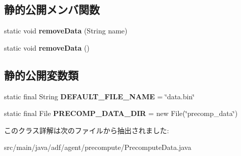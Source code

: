 \subsection*{静的公開メンバ関数}
\begin{DoxyCompactItemize}
\item 
\hypertarget{classadf_1_1agent_1_1precompute_1_1PrecomputeData_a84d099f53a96c92491f7fe22ff609f3b}{}\label{classadf_1_1agent_1_1precompute_1_1PrecomputeData_a84d099f53a96c92491f7fe22ff609f3b} 
static void {\bfseries remove\+Data} (String name)
\item 
\hypertarget{classadf_1_1agent_1_1precompute_1_1PrecomputeData_a2e36ef1dba632b9dc1480e38a7c6a9e8}{}\label{classadf_1_1agent_1_1precompute_1_1PrecomputeData_a2e36ef1dba632b9dc1480e38a7c6a9e8} 
static void {\bfseries remove\+Data} ()
\end{DoxyCompactItemize}
\subsection*{静的公開変数類}
\begin{DoxyCompactItemize}
\item 
\hypertarget{classadf_1_1agent_1_1precompute_1_1PrecomputeData_a5ddfa358838a988c4974cfe31fad115f}{}\label{classadf_1_1agent_1_1precompute_1_1PrecomputeData_a5ddfa358838a988c4974cfe31fad115f} 
static final String {\bfseries D\+E\+F\+A\+U\+L\+T\+\_\+\+F\+I\+L\+E\+\_\+\+N\+A\+ME} = \char`\"{}data.\+bin\char`\"{}
\item 
\hypertarget{classadf_1_1agent_1_1precompute_1_1PrecomputeData_aaf15e6515d8b927df7824b4ffa7d7319}{}\label{classadf_1_1agent_1_1precompute_1_1PrecomputeData_aaf15e6515d8b927df7824b4ffa7d7319} 
static final File {\bfseries P\+R\+E\+C\+O\+M\+P\+\_\+\+D\+A\+T\+A\+\_\+\+D\+IR} = new File(\char`\"{}precomp\+\_\+data\char`\"{})
\end{DoxyCompactItemize}


このクラス詳解は次のファイルから抽出されました\+:\begin{DoxyCompactItemize}
\item 
src/main/java/adf/agent/precompute/Precompute\+Data.\+java\end{DoxyCompactItemize}

